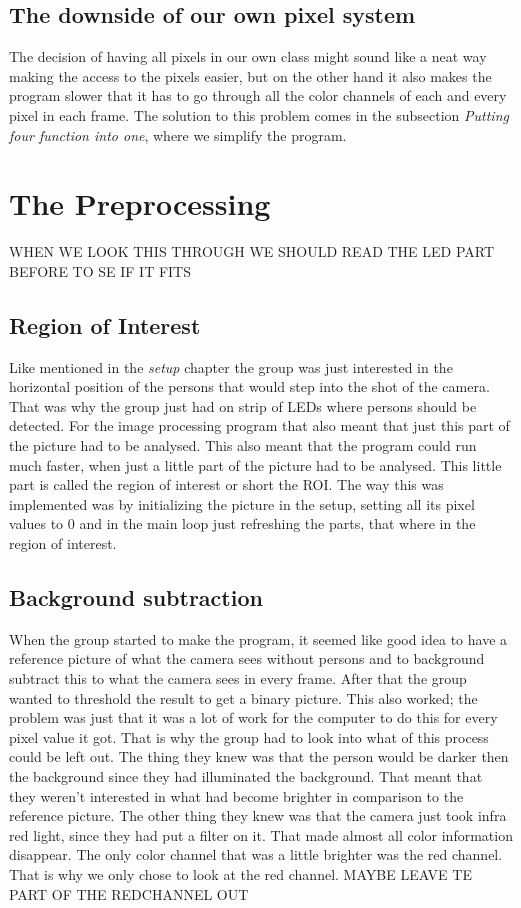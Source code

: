 \subsection{The downside of our own pixel system}

The decision of having all pixels in our own class might sound like a neat way making the access to the pixels easier, but on the other hand it also makes the program slower that it has to go through all the color channels of each and every pixel in each frame. The solution to this problem comes in the subsection \textit{Putting four function into one}, where we simplify the program. 

\section{The Preprocessing}
WHEN WE LOOK THIS THROUGH WE SHOULD READ THE LED PART BEFORE TO SE IF IT FITS
\subsection{Region of Interest}
Like mentioned in the \textit{setup} chapter the group was just interested in the horizontal position of the persons that would step into the shot of the camera. That was why the group just had on strip of LEDs where persons should be detected. For the image processing program that also meant that just this part of the picture had to be analysed. This also meant that the program could run much faster, when just a little part of the picture had to be analysed. This little part is called the region of interest or short the ROI. 
The way this was implemented was by initializing the picture in the setup, setting all its pixel values to 0 and in the main loop just refreshing the parts, that where in the region of interest. 
\subsection{Background subtraction}
When the group started to make the program, it seemed like good idea to have a reference picture of what the camera sees without persons and to background subtract this to what the camera sees in every frame. After that the group wanted to threshold the result to get a binary picture. 
This also worked; the problem was just that it was a lot of work for the computer to do this for every pixel value it got. That is why the group had to look into what of this process could be left out. 
The thing they knew was that the person would be darker then the background since they had illuminated the background. That meant that they weren't interested in what had become brighter in comparison to the reference picture. The other thing they knew was that the camera just took infra red light, since they had put a filter on it. That made almost all color information disappear. The only color channel that was a little brighter was the red channel. That is why we only chose to look at the red channel. MAYBE LEAVE TE PART OF THE REDCHANNEL OUT

